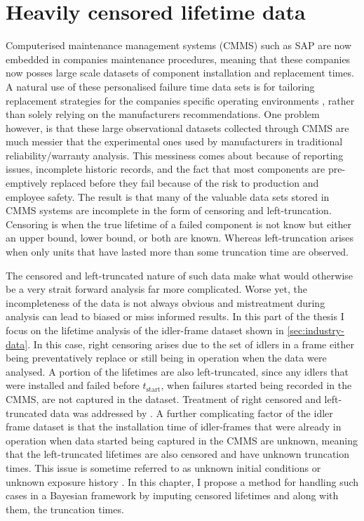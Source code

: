 \chapter{Heavily censored lifetime data}\label{chap:chapter2}

Computerised maintenance management systems (CMMS) such as SAP \citep{sap} are now embedded in companies maintenance procedures, meaning that these companies now posses large scale datasets of component installation and replacement times. A natural use of these personalised failure time data sets is for tailoring replacement strategies for the companies specific operating environments \citep[p. 13]{Meeker2022}, rather than solely relying on the manufacturers recommendations. One problem however, is that these large observational datasets collected through CMMS are much messier that the experimental ones used by manufacturers in traditional reliability/warranty analysis. This messiness comes about because of reporting issues, incomplete historic records, and the fact that most components are pre-emptively replaced before they fail because of the risk to production and employee safety. The result is that many of the valuable data sets stored in CMMS systems are incomplete in the form of censoring and left-truncation. Censoring is when the true lifetime of a failed component is not know but either an upper bound, lower bound, or both are known. Whereas left-truncation arises when only units that have lasted more than some truncation time are observed.

The censored and left-truncated nature of such data make what would otherwise be a very strait forward analysis far more complicated. Worse yet, the incompleteness of the data is not always obvious and mistreatment during analysis can lead to biased or miss informed results. In this part of the thesis I focus on the lifetime analysis of the idler-frame dataset shown in \ref{sec:industry-data}. In this case, right censoring arises due to the set of idlers in a frame either being preventatively replace or still being in operation when the data were analysed. A portion of the lifetimes are also left-truncated, since any idlers that were installed and failed before $t_\text{start}$, when failures started being recorded in the CMMS, are not captured in the dataset. Treatment of right censored and left-truncated data was addressed by \citet{hong2009}. A further complicating factor of the idler frame dataset is that the installation time of idler-frames that were already in operation when data started being captured in the CMMS are unknown, meaning that the left-truncated lifetimes are also censored and have unknown truncation times. This issue is sometime referred to as unknown initial conditions \citep{} or unknown exposure history \citep{}. In this chapter, I propose a method for handling such cases in a Bayesian framework by imputing censored lifetimes and along with them, the truncation times.

